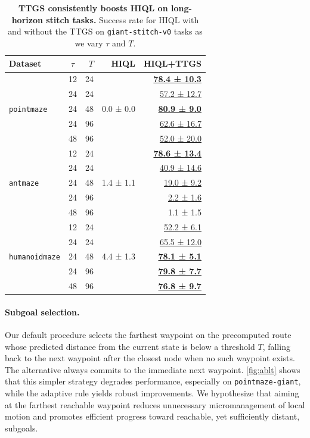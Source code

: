 \documentclass{article} %
\begin{document}
\begin{table}[t]
    \centering
    \small
    \caption{\textbf{TTGS consistently boosts HIQL on long-horizon stitch tasks.} Success rate for HIQL with and without the TTGS on \texttt{giant-stitch-v0} tasks as we vary $\tau$ and $T$. }
    \label{tab:giant_stitch_hparam_hiql}
    \begin{tabular*}{1\linewidth}{@{\extracolsep{\fill}}lcrrr}
      \toprule
      \textbf{Dataset} & \textbf{$\tau$} & $T$ & \textbf{HIQL} & \textbf{HIQL+TTGS} \\
      \midrule
      \multirow{5}{*}{\texttt{pointmaze}}
        & 12 & 24 & \multirow{5}{*}{0.0 ± 0.0 } & \underline{\textbf{78.4 ± 10.3}} \\
        & 24 & 24 & & \underline{57.2 ± 12.7}\\
        & 24 & 48 & & \underline{\textbf{80.9 ± 9.0}} \\
        & 24 & 96 & & \underline{62.6 ± 16.7} \\
        & 48 & 96 & & \underline{52.0 ± 20.0} \\
    \midrule
      \multirow{5}{*}{\texttt{antmaze}}
        & 12 & 24 & \multirow{5}{*}{ 1.4 ± 1.1 } & \underline{\textbf{78.6 ± 13.4}} \\
        & 24 & 24 & & \underline{40.9 ± 14.6} \\
        & 24 & 48 & & \underline{19.0 ± 9.2} \\
        & 24 & 96 & & \underline{2.2 ± 1.6} \\
        & 48 & 96 & & 1.1 ± 1.5 \\
      \midrule
      \multirow{5}{*}{\texttt{humanoidmaze}}
        & 12 & 24 & \multirow{5}{*}{4.4 ± 1.3} & \underline{52.2 ± 6.1} \\
        & 24 & 24 & & \underline{65.5 ± 12.0} \\
        & 24 & 48 & & \underline{\textbf{78.1 ± 5.1}} \\
        & 24 & 96 & & \underline{\textbf{79.8 ± 7.7}} \\
        & 48 & 96 & & \underline{\textbf{76.8 ± 9.7}} \\
      \bottomrule
    \end{tabular*}
    \vskip -0.1in
\end{table}

\paragraph{Subgoal selection.}
Our default procedure selects the farthest waypoint on the precomputed route whose predicted distance from the current state is below a threshold $T$, falling back to the next waypoint after the closest node when no such waypoint exists. The alternative always commits to the immediate next waypoint. \autoref{fig:ablt} shows that this simpler strategy degrades performance, especially on \texttt{pointmaze-giant}, while the adaptive rule yields robust improvements. We hypothesize that aiming at the farthest reachable waypoint reduces unnecessary micromanagement of local motion and promotes efficient progress toward reachable, yet sufficiently distant, subgoals.
\end{document}
